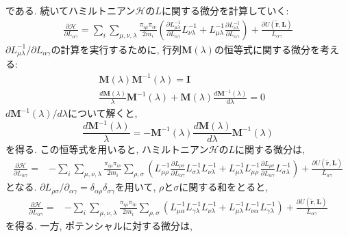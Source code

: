 である. 続いてハミルトニアン$\mathcal{H}$の$L$に関する微分を計算していく:
\begin{align}
  \frac{\partial \mathcal{H}}{\partial L_{\alpha\gamma}} =
  \sum_{i} \sum_{\mu,\nu,\lambda} \frac{\pi_{i\mu}\pi_{i\nu}}{2m_{i}}
  \left(
    \frac{\partial L_{\mu\lambda}^{-1}}{\partial L_{\alpha\gamma}} L_{\nu\lambda}^{-1} +
    L_{\mu\lambda}^{-1} \frac{\partial L_{\nu\lambda}^{-1}}{\partial L_{\alpha\gamma}}
  \right) +
  \frac{\partial U(\tilde{\bm{r}}, \bm{L})}{L_{\alpha\gamma}}
\end{align}
$\partial L_{\mu\lambda}^{-1}/\partial L_{\alpha\gamma}$の計算を実行するために, 行列$\bm{M}(\lambda)$の恒等式に関する微分を考える:
\begin{align}
  &\bm{M}(\lambda)\bm{M}^{-1}(\lambda) = \bm{I} \\
  &\frac{d\bm{M}(\lambda)}{\lambda} \bm{M}^{-1}(\lambda) + \bm{M}(\lambda)\frac{d\bm{M}^{-1}(\lambda)}{d\lambda} = 0
\end{align}
$d\bm{M}^{-1}(\lambda)/d\lambda$について解くと, 
\begin{equation}
  \frac{d\bm{M}^{-1}(\lambda)}{\lambda} = - \bm{M}^{-1}(\lambda)\frac{d\bm{M}(\lambda)}{d\lambda} \bm{M}^{-1}(\lambda)
\end{equation}
を得る. この恒等式を用いると, ハミルトニアン$\mathcal{H}$の$L$に関する微分は, 
\begin{align}
  \frac{\partial \mathcal{H}}{\partial L_{\alpha\gamma}} =&
  -\sum_{i} \sum_{\mu,\nu,\lambda} \frac{\pi_{i\mu}\pi_{i\nu}}{2m_{i}}
  \sum_{\rho,\sigma}
  \left(
    L_{\mu\rho}^{-1} \frac{\partial L_{\rho\sigma}}{\partial L_{\alpha\gamma}} L_{\sigma\lambda}^{-1} L_{\nu\lambda}^{-1} +
    L_{\mu\lambda}^{-1} L_{\mu\rho}^{-1} \frac{\partial L_{\rho\sigma}}{\partial L_{\alpha\gamma}} L_{\sigma\lambda}^{-1}
  \right) +
  \frac{\partial U(\tilde{\bm{r}}, \bm{L})}{L_{\alpha\gamma}}
\end{align}
となる. $\partial L_{\rho\sigma}/\partial_{\alpha\gamma} = \delta_{\alpha\rho}\delta_{\sigma\gamma}$を用いて, $\rho$と$\sigma$に関する和をとると,
\begin{align}
  \frac{\partial \mathcal{H}}{\partial L_{\alpha\gamma}} =&
  -\sum_{i} \sum_{\mu,\nu,\lambda} \frac{\pi_{i\mu}\pi_{i\nu}}{2m_{i}}
  \sum_{\rho,\sigma}
  \left(
    L_{\mu\alpha}^{-1} L_{\gamma\lambda}^{-1} L_{\nu\lambda}^{-1} +
    L_{\mu\lambda}^{-1} L_{\nu\alpha}^{-1} L_{\gamma\lambda}^{-1}
  \right) +
  \frac{\partial U(\tilde{\bm{r}}, \bm{L})}{L_{\alpha\gamma}}
\end{align}
を得る. 一方, ポテンシャルに対する微分は, 

